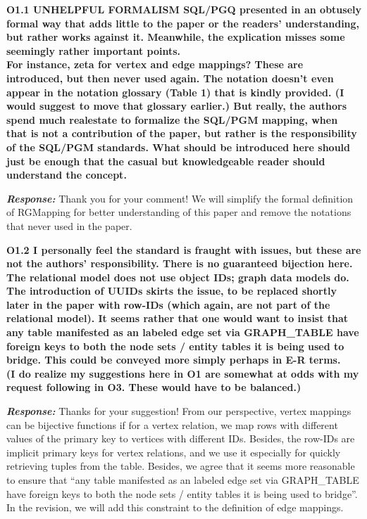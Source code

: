 \textbf{
O1.1 UNHELPFUL FORMALISM
SQL/PGQ presented in an obtusely formal way that adds little to the paper or the readers' understanding, but rather works against it. 
Meanwhile, the explication misses some seemingly rather important points. \\
For instance, zeta for vertex and edge mappings? These are introduced, but then never used again. The notation doesn't even appear in the notation glossary (Table 1) that is kindly provided. (I would suggest to move that glossary earlier.) But really, the authors spend much realestate to formalize the SQL/PGM mapping, when that is not a contribution of the paper, but rather is the responsibility of the SQL/PGM standards. What should be introduced here should just be enough that the casual but knowledgeable reader should understand the concept.}

\textbf{\textit{Response: }}
Thank you for your comment! We will simplify the formal definition of RGMapping for better understanding of this paper and remove the notations that never used in the paper.


\textbf{
O1.2 I personally feel the standard is fraught with issues, but these are not the authors' responsibility. There is no guaranteed bijection here. The relational model does not use object IDs; graph data models do. The introduction of UUIDs skirts the issue, to be replaced shortly later in the paper with row-IDs (which again, are not part of the relational model). It seems rather that one would want to insist that any table manifested as an labeled edge set via GRAPH\_TABLE have foreign keys to both the node sets / entity tables it is being used to bridge. This could be conveyed more simply perhaps in E-R terms. \\
(I do realize my suggestions here in O1 are somewhat at odds with my request following in O3. These would have to be balanced.)}

\textbf{\textit{Response: }}
Thanks for your suggestion! From our perspective, vertex mappings can be bijective functions if for a vertex relation, we map rows with different values of the primary key to vertices with different IDs. Besides, the row-IDs are implicit primary keys for vertex relations, and we use it especially for quickly retrieving tuples from the table. Besides, we agree that it seems more reasonable to ensure that ``any table manifested as an labeled edge set via GRAPH\_TABLE have foreign keys to both the node sets / entity tables it is being used to bridge''. In the revision, we will add this constraint to the definition of edge mappings.


